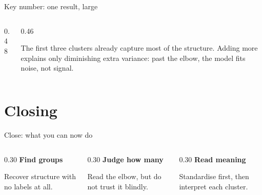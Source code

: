 \documentclass[aspectratio=169]{beamer}
\begin{document}
\begin{frame}{Key number: one result, large}
  \begin{columns}[c,onlytextwidth]
    \begin{column}{0.48\textwidth}
      \centering
    \end{column}
    \begin{column}{0.46\textwidth}
      \color{tddim}\small\raggedright
      The first three clusters already capture most of the structure. Adding more
      explains only \textcolor{DHBWred}{diminishing} extra variance: past the
      elbow, the model fits noise, not signal.
    \end{column}
  \end{columns}
\end{frame}

\section{Closing}

\begin{frame}{Close: what you can now do}
  \begin{columns}[T,onlytextwidth]
    \begin{column}{0.30\textwidth}
      \textbf{Find groups}\par\smallskip
      {\color{tddim}Recover structure with no labels at all.}
    \end{column}
    \begin{column}{0.30\textwidth}
      \textbf{Judge how many}\par\smallskip
      {\color{tddim}Read the elbow, but do not \textcolor{DHBWred}{trust} it
      blindly.}
    \end{column}
    \begin{column}{0.30\textwidth}
      \textbf{Read meaning}\par\smallskip
      {\color{tddim}Standardise first, then interpret each cluster.}
    \end{column}
  \end{columns}
\end{frame}
\end{document}
